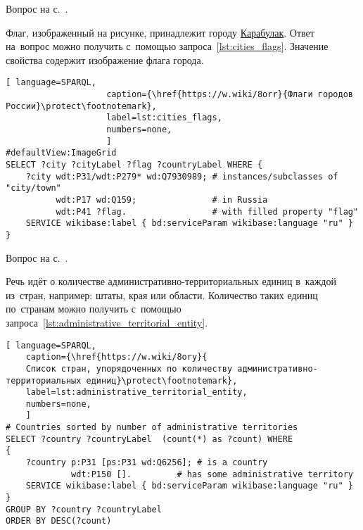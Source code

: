 \begin{task}
    \label{answer:cities_flags}
    \AnswerBackref Вопрос на с.~\pageref{lst:countries_sister_cities_with_Russia}.

    Флаг, изображенный на рисунке, 
    принадлежит городу \href{https://ru.wikipedia.org/?curid=92075}{Карабулак}. 
    Ответ на~вопрос можно получить с~помощью запроса~\ref{lst:cities_flags}. 
    Значение свойства  
    содержит изображение флага города.
    
    \newpage
    \begin{lstlisting}[ language=SPARQL, 
                    caption={\href{https://w.wiki/8orr}{Флаги городов России}\protect\footnotemark},
                    label=lst:cities_flags,
                    numbers=none,
                    ]
#defaultView:ImageGrid
SELECT ?city ?cityLabel ?flag ?countryLabel WHERE {
    ?city wdt:P31/wdt:P279* wd:Q7930989; # instances/subclasses of "city/town"
          wdt:P17 wd:Q159;               # in Russia
          wdt:P41 ?flag.                 # with filled property "flag"
    SERVICE wikibase:label { bd:serviceParam wikibase:language "ru" }
}
\end{lstlisting}
\end{task}




\hfil{}\hfil%
\begin{task}
	\label{answer:administrative_territorial}
    \AnswerBackref Вопрос на с.~\pageref{lst:age_of_country}.

Речь идёт о количестве 
административно-территориальных единиц в~каждой из~стран, например: штаты, края или области. 
Количество таких единиц по~странам 
    можно получить с~помощью запроса~\ref{lst:administrative_territorial_entity}.
	
\begin{lstlisting}[ language=SPARQL, 
	caption={\href{https://w.wiki/8ory}{
	Список стран, упорядоченных по количеству административно-территориальных единиц}\protect\footnotemark},
	label=lst:administrative_territorial_entity,
    numbers=none,
    ]
# Countries sorted by number of administrative territories
SELECT ?country ?countryLabel  (count(*) as ?count) WHERE
{
    ?country p:P31 [ps:P31 wd:Q6256]; # is a country
             wdt:P150 [].         # has some administrative territory
    SERVICE wikibase:label { bd:serviceParam wikibase:language "ru" }
}
GROUP BY ?country ?countryLabel
ORDER BY DESC(?count)
\end{lstlisting}
\end{task}



